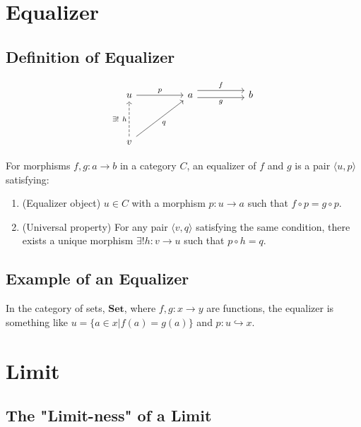 \documentclass[uplatex,a4j,12pt,dvipdfmx]{jsarticle}
\begin{document}
\section{Equalizer}

\subsection{Definition of Equalizer}

\[
	\begin{tikzcd}
		u \arrow[rr, "p"]&& a \arrow[rr, "f", shift left=2] \arrow[rr, "g"', shift right] && b \\
		&&&&\\
		v \arrow[rruu, "q"'] \arrow[uu, "\exists ! \ h", dashed] &&&&
	\end{tikzcd}
\]


For morphisms $f,g : a \to b$ in a category $C$, an equalizer of $f$ and $g$ is a pair $\langle u, p \rangle$ satisfying:

\begin{enumerate}
	\item (Equalizer object) $u \in C$ with a morphism $p: u \to a$ such that $f \circ p = g \circ p$.
	\item (Universal property) For any pair $\langle v, q \rangle$ satisfying the same condition, there exists a unique morphism $\exists ! h: v \to u$ such that $p \circ h = q$.
\end{enumerate}


\subsection{Example of an Equalizer}

In the category of sets, $\textbf{Set}$, where $f,g: x \to y$ are functions, the equalizer is something like $u = \{ a \in x | f(a) = g(a) \}$ and $p : u \hookrightarrow x$.


\section{Limit}

\subsection{The "Limit-ness" of a Limit}
\end{document}
